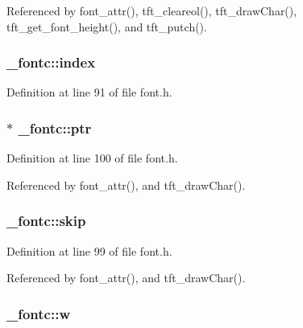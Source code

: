 Referenced by font\-\_\-attr(), tft\-\_\-cleareol(), tft\-\_\-draw\-Char(), tft\-\_\-get\-\_\-font\-\_\-height(), and tft\-\_\-putch().

\hypertarget{struct__fontc_a7cc0370744ff7ea964054d36917c9a2f}{
\subsubsection[{index}]{ \-\_\-fontc\-::index}}\label{struct__fontc_a7cc0370744ff7ea964054d36917c9a2f}


Definition at line 91 of file font.\-h.

\hypertarget{struct__fontc_a60a3fef5ccd80dff543aac3f22f74876}{
\subsubsection[{ptr}]{ $\ast$ \-\_\-fontc\-::ptr}}\label{struct__fontc_a60a3fef5ccd80dff543aac3f22f74876}


Definition at line 100 of file font.\-h.



Referenced by font\-\_\-attr(), and tft\-\_\-draw\-Char().

\hypertarget{struct__fontc_a44c94e91afa006cb2ffe55a99b3e2d3c}{
\subsubsection[{skip}]{ \-\_\-fontc\-::skip}}\label{struct__fontc_a44c94e91afa006cb2ffe55a99b3e2d3c}


Definition at line 99 of file font.\-h.



Referenced by font\-\_\-attr(), and tft\-\_\-draw\-Char().

\hypertarget{struct__fontc_a9c2af0354d2b2009e7b6684e25fd479b}{
\subsubsection[{w}]{ \-\_\-fontc\-::w}}\label{struct__fontc_a9c2af0354d2b2009e7b6684e25fd479b}


